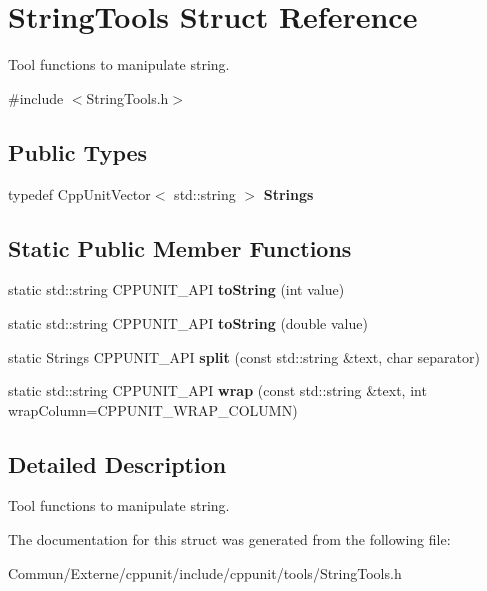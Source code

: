 \hypertarget{struct_string_tools}{}\section{String\+Tools Struct Reference}
\label{struct_string_tools}


Tool functions to manipulate string.  




{\ttfamily \#include $<$String\+Tools.\+h$>$}

\subsection*{Public Types}
\begin{DoxyCompactItemize}
\item 
typedef Cpp\+Unit\+Vector$<$ std\+::string $>$ {\bfseries Strings}\hypertarget{struct_string_tools_ab01d065d80c39015955e9f765cd19921}{}\label{struct_string_tools_ab01d065d80c39015955e9f765cd19921}

\end{DoxyCompactItemize}
\subsection*{Static Public Member Functions}
\begin{DoxyCompactItemize}
\item 
static std\+::string C\+P\+P\+U\+N\+I\+T\+\_\+\+A\+PI {\bfseries to\+String} (int value)\hypertarget{struct_string_tools_a2b4a4cbbfa69a2c28c71bd519ba71e5c}{}\label{struct_string_tools_a2b4a4cbbfa69a2c28c71bd519ba71e5c}

\item 
static std\+::string C\+P\+P\+U\+N\+I\+T\+\_\+\+A\+PI {\bfseries to\+String} (double value)\hypertarget{struct_string_tools_adfab22bf90b73231f635aa1ae299d4c4}{}\label{struct_string_tools_adfab22bf90b73231f635aa1ae299d4c4}

\item 
static Strings C\+P\+P\+U\+N\+I\+T\+\_\+\+A\+PI {\bfseries split} (const std\+::string \&text, char separator)\hypertarget{struct_string_tools_ac3c3d30a35c82c1d5fcb54e915130767}{}\label{struct_string_tools_ac3c3d30a35c82c1d5fcb54e915130767}

\item 
static std\+::string C\+P\+P\+U\+N\+I\+T\+\_\+\+A\+PI {\bfseries wrap} (const std\+::string \&text, int wrap\+Column=C\+P\+P\+U\+N\+I\+T\+\_\+\+W\+R\+A\+P\+\_\+\+C\+O\+L\+U\+MN)\hypertarget{struct_string_tools_a02d43819e61394264c3e75c24433a057}{}\label{struct_string_tools_a02d43819e61394264c3e75c24433a057}

\end{DoxyCompactItemize}


\subsection{Detailed Description}
Tool functions to manipulate string. 

The documentation for this struct was generated from the following file\+:\begin{DoxyCompactItemize}
\item 
Commun/\+Externe/cppunit/include/cppunit/tools/String\+Tools.\+h\end{DoxyCompactItemize}
